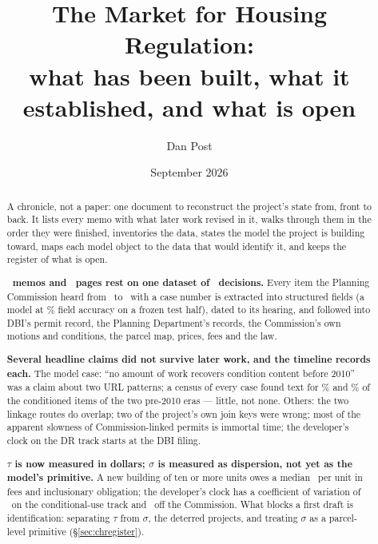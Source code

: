 \documentclass[11pt]{article}
\title{The Market for Housing Regulation:\\
\large what has been built, what it established, and what is open}
\author{Dan Post}
\date{September 2026}
\begin{document}
\maketitle

\begin{abstract}
\noindent
A chronicle, not a paper: one document to reconstruct the project's state from, front to back.
It lists every memo with what later work revised in it, walks through them in the order they
were finished, inventories the data, states the model the project is building toward, maps each
model object to the data that would identify it, and keeps the register of what is open.

\medskip\noindent
\textbf{\chMemos\ memos and \chPagesTotal\ pages rest on one dataset of \chItems\ decisions.}
Every item the Planning Commission heard from \chItemFirst\ to \chItemLast\ with a case number is
extracted into structured fields (a model at \chHaikuTest\% field accuracy on a frozen test half),
dated to its hearing, and followed into DBI's permit record, the Planning Department's records,
the Commission's own motions and conditions, the parcel map, prices, fees and the law.

\medskip\noindent
\textbf{Several headline claims did not survive later work, and the timeline records each.} The
model case: ``no amount of work recovers condition content before 2010'' was a claim about two
URL patterns; a census of every case found text for \condReachEarlyHtml\% and
\condReachLateHtml\% of the conditioned items of the two pre-2010 eras --- little, not none.
Others: the two linkage routes do overlap; two of the project's own join keys were wrong; most of
the apparent slowness of Commission-linked permits is immortal time; the developer's clock on
the DR track starts at the DBI filing.

\medskip\noindent
\textbf{$\tau$ is now measured in dollars; $\sigma$ is measured as dispersion, not yet as the
model's primitive.} A new building of ten or more units owes a median \exPuMed\ per unit in
fees and inclusionary obligation; the developer's clock has a coefficient of variation of
\ckTotCvCu\ on the conditional-use track and \ckTotCvMin\ off the Commission. What blocks a first
draft is identification: separating $\tau$ from $\sigma$, the deterred projects, and treating
$\sigma$ as a parcel-level primitive (\S\ref{sec:chregister}).
\end{abstract}

\clearpage
\tableofcontents
\clearpage
\end{document}
